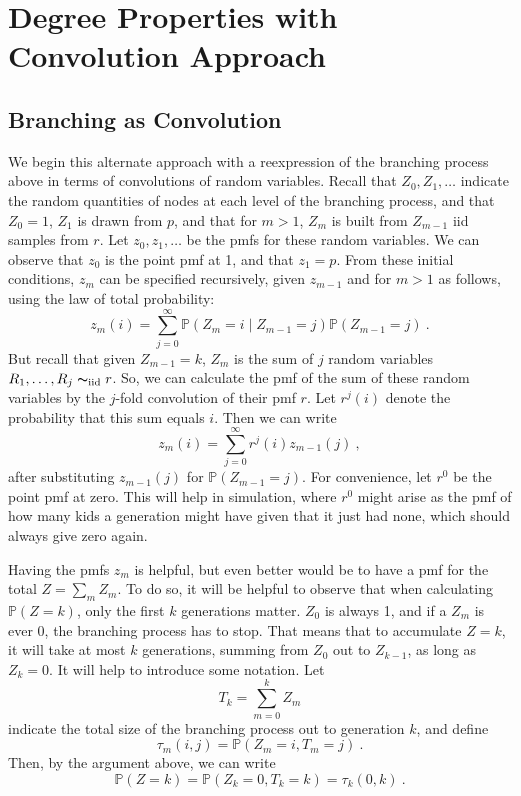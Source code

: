 \documentclass[12pt]{article}
\newcommand{\iid}{\mathrm{iid}}
\renewcommand{\P}{\mathbb{P}}
\begin{document}
\section{\textbf{\textsf{Degree Properties with Convolution Approach}}}

\subsection{\textbf{\textsf{Branching as Convolution}}}

We begin this alternate approach with a reexpression of the branching
process above in terms of convolutions of random variables. Recall that
$Z_0,Z_1,\dotsc$ indicate the random quantities of nodes at each level
of the branching process, and that $Z_0=1$, $Z_1$ is drawn from $p$,
and that for $m>1$, $Z_m$ is built from $Z_{m-1}$ iid samples from $r$.
Let $z_0,z_1,\dotsc$ be the pmfs for these random variables. We can
observe that $z_0$ is the point pmf at 1, and that $z_1 = p$. From these
initial conditions, $z_m$ can be specified recursively, given $z_{m-1}$
and for $m>1$ as follows, using the law of total probability:
\[
z_m(i) = \sum_{j=0}^\infty \P(Z_m=i\mid Z_{m-1}=j)\P(Z_{m-1}=j)\ .
\]
But recall that given $Z_{m-1}=k$, $Z_m$ is the sum of $j$
random variables $R_1,\dotsc,R_j \thicksim_\iid r$. So, we can calculate
the pmf of the sum of these random variables by the $j$-fold convolution
of their pmf $r$. Let $r^j(i)$ denote the probability that this sum equals
$i$. Then we can write
\[
z_m(i) = \sum_{j=0}^\infty r^j(i)z_{m-1}(j)\ ,
\]
after substituting $z_{m-1}(j)$ for $\P(Z_{m-1}=j)$. For convenience,
let $r^0$ be the point pmf at zero. This will help in simulation, where
$r^0$ might arise as the pmf of how many kids a generation might have
given that it just had none, which should always give zero again.\par

Having the pmfs $z_m$ is helpful, but even better would be to have a pmf for
the total $Z=\sum_m Z_m$. To do so, it will be helpful to observe that
when calculating $\P(Z=k)$, only the first $k$ generations matter. $Z_0$
is always 1, and if a $Z_m$ is ever 0, the branching process has to stop.
That means that to accumulate $Z=k$, it will take at most $k$ generations,
summing from $Z_0$ out to $Z_{k-1}$, as long as $Z_k=0$. It will help to
introduce some notation. Let \[ T_k = \sum_{m=0}^{k} Z_m \] indicate the
total size of the branching process out to generation $k$, and define
\[ \tau_m(i, j) = \P(Z_m = i, T_m = j)\ .\] Then, by the argument above,
we can write \[ \P(Z = k) = \P(Z_k=0,T_k=k) = \tau_k(0,k)\ . \]\par
\end{document}
